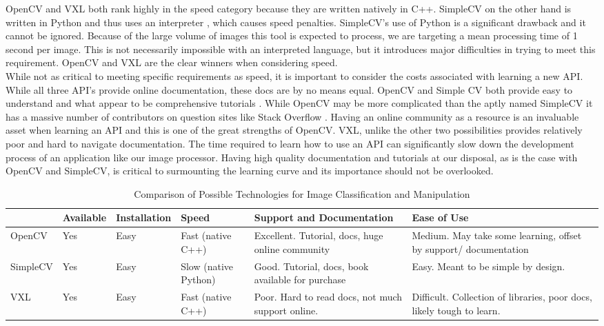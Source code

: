 \documentclass[10pt, onecolumn, draftclsnofoot, letterpaper, compsoc]{IEEEtran}
\begin{document}
OpenCV and VXL both rank highly in the speed category because they are written
natively in C++\cite{OCV, VXL}. SimpleCV on the other hand is written in Python
and thus uses an interpreter \cite{SCV}, which causes speed penalties.
SimpleCV’s use of Python is a significant drawback and it cannot be ignored.
Because of the large volume of images this tool is expected to process, we are
targeting a mean processing time of 1 second per image. This is not necessarily
impossible with an interpreted language, but it introduces major difficulties in
trying to meet this requirement. OpenCV and VXL are the clear winners when
considering speed. \\

While not as critical to meeting specific requirements as speed, it is important
to consider the costs associated with learning a new API. While all three API's
provide online documentation, these docs are by no means equal. OpenCV and
Simple CV both provide easy to understand and what appear to be comprehensive
tutorials \cite{OCV, SCV}. While OpenCV may be more complicated than the aptly
named SimpleCV it has a massive number of contributors on question sites like
Stack Overflow \cite{stkovrflw}. Having an online community as a resource is an
invaluable asset when learning an API and this is one of the great strengths of
OpenCV. VXL, unlike the other two possibilities provides relatively poor and
hard to navigate documentation. The time required to learn how to use an API can
significantly slow down the development process of an application like our image
processor. Having high quality documentation and tutorials at our disposal, as
is the case with OpenCV and SimpleCV, is critical to surmounting the learning
curve and its importance should not be overlooked. \\

\begin{table}[h]
\centering
\caption{Comparison of Possible Technologies for Image Classification and Manipulation}
\begin{tabular}{|p{2.1cm}|p{2.1cm}|p{2.1cm}|p{2.1cm}|p{2.1cm}|p{2.1cm}|}
\cline{4-4}

\hline  & Available & Installation & Speed & Support and Documentation & Ease of
Use  \\ \hline

OpenCV  & Yes & Easy & Fast (native C++) &  Excellent. Tutorial, docs, huge
online community & Medium. May take some learning, offset by support/
documentation  \\ \hline

SimpleCV & Yes & Easy & Slow (native Python) & Good. Tutorial, docs, book
available for purchase & Easy. Meant to be simple by design.  \\ \hline

VXL & Yes & Easy & Fast (native C++) & Poor. Hard to read docs, not much support
online. & Difficult. Collection of libraries, poor docs, likely tough to learn.
\\ \hline

\end{tabular}
\label{table:george1}
\end{table}
\end{document}
